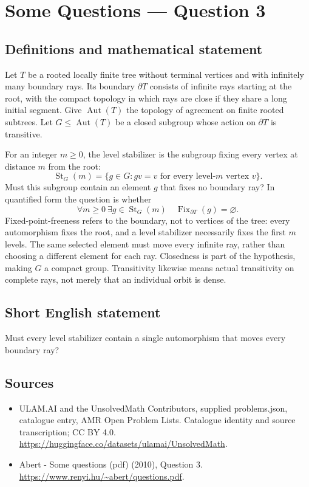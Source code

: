 \documentclass[11pt,a4paper]{article}
\begin{document}
\section*{Some Questions — Question 3}\label{statement}

\subsection{Definitions and mathematical statement}
Let $T$ be a rooted locally finite tree without terminal vertices and with infinitely many boundary rays. Its boundary $\partial T$ consists of infinite rays starting at the root, with the compact topology in which rays are close if they share a long initial segment. Give $\operatorname{Aut}(T)$ the topology of agreement on finite rooted subtrees. Let $G\leq\operatorname{Aut}(T)$ be a closed subgroup whose action on $\partial T$ is transitive.

For an integer $m\geq0$, the level stabilizer is the subgroup fixing every vertex at distance $m$ from the root:
\[
 \operatorname{St}_G(m)=\{g\in G:gv=v\text{ for every level-}m\text{ vertex }v\}.
\]
Must this subgroup contain an element $g$ that fixes no boundary ray? In quantified form the question is whether
\[
 \forall m\geq0\ \exists g\in\operatorname{St}_G(m)\quad
                  \operatorname{Fix}_{\partial T}(g)=\varnothing.
\]
Fixed-point-freeness refers to the boundary, not to vertices of the tree: every automorphism fixes the root, and a level stabilizer necessarily fixes the first $m$ levels. The same selected element must move every infinite ray, rather than choosing a different element for each ray. Closedness is part of the hypothesis, making $G$ a compact group. Transitivity likewise means actual transitivity on complete rays, not merely that an individual orbit is dense.
\subsection{Short English statement}
Must every level stabilizer contain a single automorphism that moves every boundary ray?
\subsection{Sources}
\begin{itemize}
\item[S1] ULAM.AI and the UnsolvedMath Contributors, supplied problems.json, catalogue entry, AMR Open Problem Lists. Catalogue identity and source transcription; CC BY 4.0.
\url{https://huggingface.co/datasets/ulamai/UnsolvedMath}.
\item[S2] Abert - Some questions (pdf) (2010), Question 3. 
\url{https://www.renyi.hu/~abert/questions.pdf}.
\end{itemize}
\end{document}
